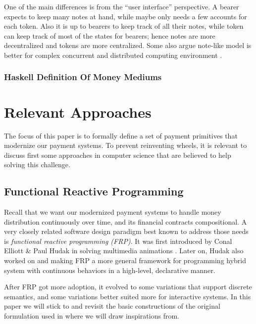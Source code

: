One of the main differences is from the ``user interface'' perspective. A bearer expects to keep many notes at hand,
while maybe only needs a few accounts for each token. Also it is up to bearers to keep track of all their notes, while
token can keep track of most of the states for bearers; hence notes are more decentralized and tokens are more
centralized. Some also argue note-like model is better for complex concurrent and distributed computing environment
.

\subsubsection{Haskell Definition Of Money Mediums}




\section{Relevant Approaches}

The focus of this paper is to formally define a set of payment primitives that modernize our payment systems. To prevent
reinventing wheels, it is relevant to discuss first some approaches in computer science that are believed to help
solving this challenge.

\subsection{Functional Reactive Programming}

Recall that we want our modernized payment systems to handle money distribution continuously over time, and its financial
contracts compositional. A very closely related software design paradigm best known to address those needs is
\textit{functional reactive programming (FRP)}. It was first introduced by Conal Elliott \& Paul Hudak in solving
multimedia animations \cite{elliott1997functional}. Later on, Hudak also worked on \cite{hudak2002arrows} and
\cite{wan2000functional} making FRP a more general framework for programming hybrid system with continuous behaviors in
a high-level, declarative manner.

After FRP got more adoption, it evolved to some variations that support discrete semantics, and some variations better
suited more for interactive systems. In this paper we will stick to and revisit the basic constructions of the original
formulation used in \cite{elliott1997functional} where we will draw inspirations from.

